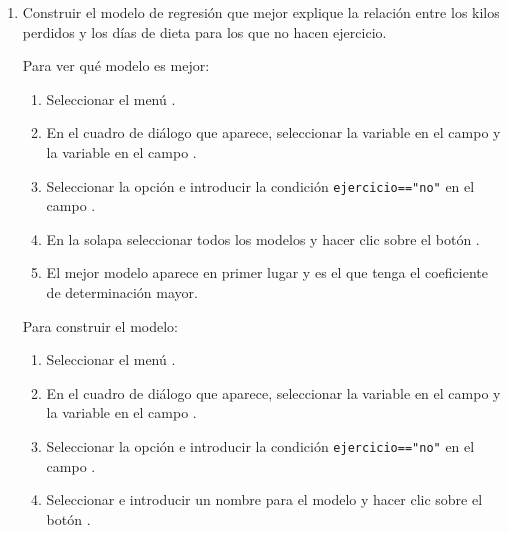 \begin{enumerate}[leftmargin=*]
\begin{enumerate}
\item Construir el modelo de regresión que mejor explique la relación entre los kilos perdidos y los días de dieta para
los que no hacen ejercicio.
\begin{indicacion}
Para ver qué modelo es mejor:
\begin{enumerate}
\item Seleccionar el menú .
\item En el cuadro de diálogo que aparece, seleccionar la variable  en el campo  y la variable  en el campo .
\item Seleccionar la opción  e introducir la condición \lstinline{ejercicio=="no"} en el campo .
\item En la solapa  seleccionar todos los modelos y hacer clic sobre el botón .
\item El mejor modelo aparece en primer lugar y es el que tenga el coeficiente de determinación mayor.
\end{enumerate}
Para construir el modelo:
\begin{enumerate}
\item Seleccionar el menú .
\item En el cuadro de diálogo que aparece, seleccionar la variable  en el campo  y la variable  en el campo .
\item Seleccionar la opción  e introducir la condición \lstinline{ejercicio=="no"} en el campo .
\item Seleccionar  e introducir un nombre para el modelo y hacer clic sobre el botón .
\end{enumerate}
\end{indicacion}


\end{enumerate}
\end{enumerate}
